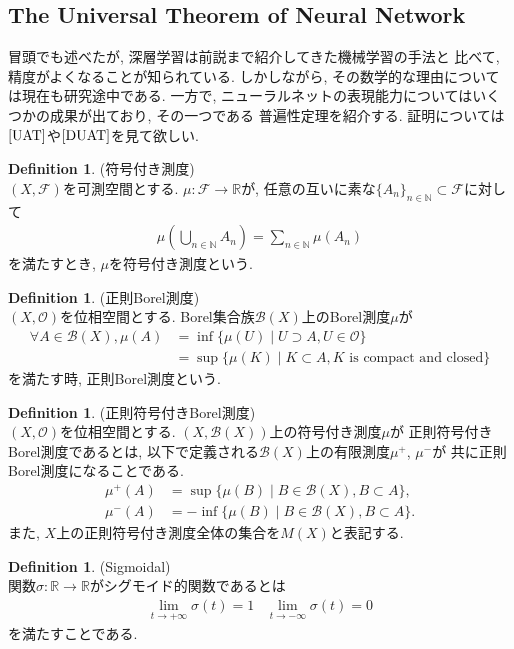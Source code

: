 \documentclass[11pt, a4paper, dvipdfmx]{jsarticle}
\theoremstyle{definition}
\newtheorem{Definition+}[Axiom+]{Definition}
\newcommand{\N}{\mathbb{N}}
\newcommand{\R}{\mathbb{R}}
\newcommand{\F}{\mathcal{F}}
\begin{document}
\subsection{The Universal Theorem of Neural Network}
冒頭でも述べたが, 深層学習は前説まで紹介してきた機械学習の手法と
比べて, 精度がよくなることが知られている. しかしながら, その数学的な理由については現在も研究途中である. 
一方で, ニューラルネットの表現能力についてはいくつかの成果が出ており, その一つである
普遍性定理を紹介する. 証明については$\cite{UAT}$や$\cite{DUAT}$を見て欲しい.
\begin{Definition+}(符号付き測度)\\
    $(X, \F)$を可測空間とする. $\mu:\F\to\R$が, 任意の互いに素な$\{A_{n}\}_{n\in\N}\subset\F$に対して
    \begin{align*}
        \mu\left(\bigcup_{n\in\N}A_{n}\right) = \sum_{n\in\N}\mu(A_{n})
    \end{align*}
    を満たすとき, $\mu$を符号付き測度という. 
\end{Definition+}
\begin{Definition+}(正則Borel測度)\\
    $(X, \mathcal{O})$を位相空間とする. Borel集合族$\mathcal{B}(X)$上のBorel測度$\mu$が
    \begin{align*}
        \forall A\in\mathcal{B}(X), \mu(A) &= \inf\{\mu(U)\mid U\supset A, U\in\mathcal{O}\} \\
                                           &= \sup\{\mu(K)\mid K\subset A, K\text{ is compact and closed}\}
    \end{align*}
    を満たす時, 正則Borel測度という. 
\end{Definition+}
\begin{Definition+}(正則符号付きBorel測度)\\
    $(X, \mathcal{O})$を位相空間とする. $(X, \mathcal{B}(X))$上の符号付き測度$\mu$が
    正則符号付きBorel測度であるとは, 以下で定義される$\mathcal{B}(X)$上の有限測度$\mu^{+}$, $\mu^{-}$が
    共に正則Borel測度になることである.
    \begin{align*}
        \mu^{+}(A) &= \sup\{\mu(B)\mid B\in\mathcal{B}(X), B\subset A\},\\
        \mu^{-}(A) &= -\inf\{\mu(B)\mid B\in\mathcal{B}(X), B\subset A\}.
    \end{align*}
    また, $X$上の正則符号付き測度全体の集合を$M(X)$と表記する.
\end{Definition+}
\begin{Definition+}(Sigmoidal)\\
    関数$\sigma:\R\to\R$がシグモイド的関数であるとは
    \begin{align*}
        \lim_{t\to+\infty} \sigma(t) = 1\hspace{10pt}\lim_{t\to-\infty} \sigma(t) = 0
    \end{align*}
    を満たすことである.
\end{Definition+}
\end{document}
